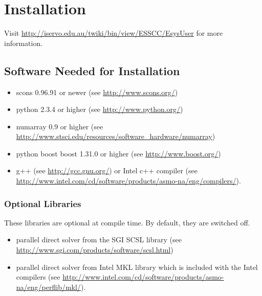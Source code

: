 %
%
%
%
%
%

\chapter{Installation}
\label{INSTALL}

Visit \url{http://iservo.edu.au/twiki/bin/view/ESSCC/EsysUser} for more information.

\section{Software Needed for Installation}

\begin{itemize}
   \item scons  0.96.91 or newer (see \url{http://www.scons.org/})
   \item python  2.3.4 or higher (see \url{http://www.python.org/})
   \item numarray  0.9 or higher (see \url{http://www.stsci.edu/resources/software_hardware/numarray})
   \item python boost boost  1.31.0 or higher (see \url{http://www.boost.org/})
   \item g++ (see \url{http://gcc.gnu.org/}) or Intel c++  compiler (see \\
\url{http://www.intel.com/cd/software/products/asmo-na/eng/compilers/}).
\end{itemize}

\subsection{Optional Libraries}
These libraries are optional at compile time. By default, they are switched off.
\begin{itemize}
   \item parallel direct solver from the SGI SCSL library (see \url{http://www.sgi.com/products/software/scsl.html})
   \item parallel direct solver from Intel MKL library which is included with the Intel compilers (see \url{http://www.intel.com/cd/software/products/asmo-na/eng/perflib/mkl/}).
\end{itemize}

